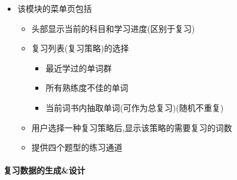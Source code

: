 \documentclass[
]{article}
\begin{document}
\begin{itemize}
\item
  该模块的菜单页包括

  \begin{itemize}
  \item
    头部显示当前的科目和学习进度(区别于复习)
  \item
    复习列表(复习策略)的选择

    \begin{itemize}
    \item
      最近学过的单词群
    \item
      所有熟练度不佳的单词
    \item
      当前词书内抽取单词(可作为总复习)(随机不重复)
    \end{itemize}
  \item
    用户选择一种复习策略后,显示该策略的需要复习的词数
  \item
    提供四个题型的练习通道
  \end{itemize}
\end{itemize}

\hypertarget{ux590dux4e60ux6570ux636eux7684ux751fux6210ux8bbeux8ba1}{%
\paragraph{复习数据的生成\&设计}\label{ux590dux4e60ux6570ux636eux7684ux751fux6210ux8bbeux8ba1}}
\end{document}

